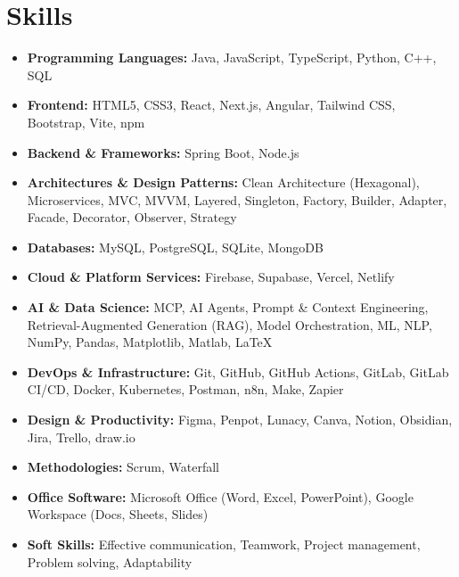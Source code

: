 \documentclass[letterpaper,12pt]{fed-res} %
\begin{document}
\section{Skills}
\begin{itemize}[leftmargin=0.15in, label={}]
    \item \textbf{Programming Languages:} Java, JavaScript, TypeScript, Python, C++, SQL
    \item \textbf{Frontend:} HTML5, CSS3, React, Next.js, Angular, Tailwind CSS, Bootstrap, Vite, npm
    \item \textbf{Backend \& Frameworks:} Spring Boot, Node.js
    \item \textbf{Architectures \& Design Patterns:} Clean Architecture (Hexagonal), Microservices, MVC, MVVM, Layered, Singleton, Factory, Builder, Adapter, Facade, Decorator, Observer, Strategy
    \item \textbf{Databases:} MySQL, PostgreSQL, SQLite, MongoDB
    \item \textbf{Cloud \& Platform Services:} Firebase, Supabase, Vercel, Netlify
    \item \textbf{AI \& Data Science:} MCP, AI Agents, Prompt \& Context Engineering, Retrieval-Augmented Generation (RAG), Model Orchestration, ML, NLP, NumPy, Pandas, Matplotlib, Matlab, \LaTeX
    \item \textbf{DevOps \& Infrastructure:} Git, GitHub, GitHub Actions, GitLab, GitLab CI/CD, Docker, Kubernetes, Postman, n8n, Make, Zapier
    \item \textbf{Design \& Productivity:} Figma, Penpot, Lunacy, Canva, Notion, Obsidian, Jira, Trello, draw.io
    \item \textbf{Methodologies:} Scrum, Waterfall
    \item \textbf{Office Software:} Microsoft Office (Word, Excel, PowerPoint), Google Workspace (Docs, Sheets, Slides)
    \item \textbf{Soft Skills:} Effective communication, Teamwork, Project management, Problem solving, Adaptability
\end{itemize}

\end{document}

